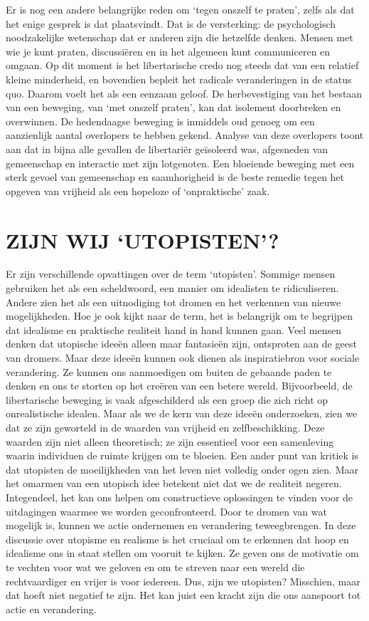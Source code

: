 \documentclass[
  a5paper,
  smalldemyvopaper,10pt,twoside,onecolumn,openright,extrafontsizes,hidelinks]{memoir}
\begin{document}
Er is nog een andere belangrijke reden om `tegen onszelf te praten',
zelfs als dat het enige gesprek is dat plaatsvindt. Dat is de
versterking: de psychologisch noodzakelijke wetenschap dat er anderen
zijn die hetzelfde denken. Mensen met wie je kunt praten, discussiëren
en in het algemeen kunt communiceren en omgaan. Op dit moment is het
libertarische credo nog steeds dat van een relatief kleine minderheid,
en bovendien bepleit het radicale veranderingen in de status quo. Daarom
voelt het als een eenzaam geloof. De herbevestiging van het bestaan van
een beweging, van `met onszelf praten', kan dat isolement doorbreken en
overwinnen. De hedendaagse beweging is inmiddels oud genoeg om een
aanzienlijk aantal overlopers te hebben gekend. Analyse van deze
overlopers toont aan dat in bijna alle gevallen de libertariër
geïsoleerd was, afgesneden van gemeenschap en interactie met zijn
lotgenoten. Een bloeiende beweging met een sterk gevoel van gemeenschap
en saamhorigheid is de beste remedie tegen het opgeven van vrijheid als
een hopeloze of `onpraktische' zaak.

\section{\texorpdfstring{\textbf{ZIJN WIJ
`UTOPISTEN'?}}{ZIJN WIJ `UTOPISTEN'?}}\label{zijn-wij-utopisten}

Er zijn verschillende opvattingen over de term `utopisten'. Sommige
mensen gebruiken het als een scheldwoord, een manier om idealisten te
ridiculiseren. Andere zien het als een uitnodiging tot dromen en het
verkennen van nieuwe mogelijkheden. Hoe je ook kijkt naar de term, het
is belangrijk om te begrijpen dat idealisme en praktische realiteit hand
in hand kunnen gaan. Veel mensen denken dat utopische ideeën alleen maar
fantasieën zijn, ontsproten aan de geest van dromers. Maar deze ideeën
kunnen ook dienen als inspiratiebron voor sociale verandering. Ze kunnen
ons aanmoedigen om buiten de gebaande paden te denken en ons te storten
op het creëren van een betere wereld. Bijvoorbeeld, de libertarische
beweging is vaak afgeschilderd als een groep die zich richt op
onrealistische idealen. Maar als we de kern van deze ideeën onderzoeken,
zien we dat ze zijn geworteld in de waarden van vrijheid en
zelfbeschikking. Deze waarden zijn niet alleen theoretisch; ze zijn
essentieel voor een samenleving waarin individuen de ruimte krijgen om
te bloeien. Een ander punt van kritiek is dat utopisten de moeilijkheden
van het leven niet volledig onder ogen zien. Maar het omarmen van een
utopisch idee betekent niet dat we de realiteit negeren. Integendeel,
het kan ons helpen om constructieve oplossingen te vinden voor de
uitdagingen waarmee we worden geconfronteerd. Door te dromen van wat
mogelijk is, kunnen we actie ondernemen en verandering teweegbrengen. In
deze discussie over utopisme en realisme is het cruciaal om te erkennen
dat hoop en idealisme ons in staat stellen om vooruit te kijken. Ze
geven ons de motivatie om te vechten voor wat we geloven en om te
streven naar een wereld die rechtvaardiger en vrijer is voor iedereen.
Dus, zijn we utopisten? Misschien, maar dat hoeft niet negatief te zijn.
Het kan juist een kracht zijn die ons aanspoort tot actie en
verandering.
\end{document}
